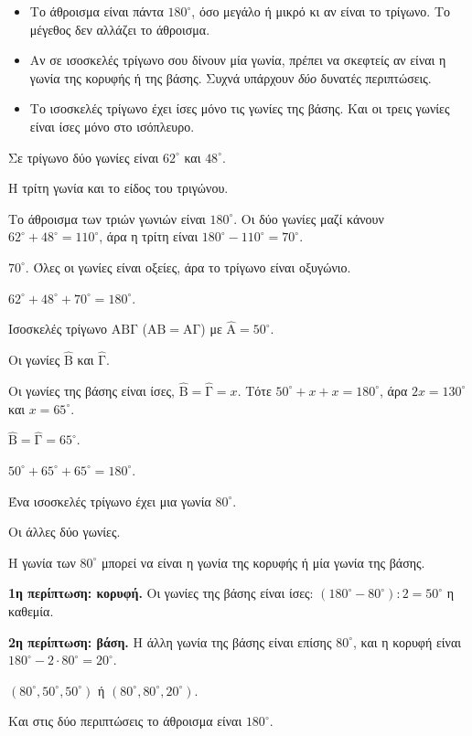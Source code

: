 \begin{prosoxi}
\begin{itemize}[leftmargin=1.2em,itemsep=0.3ex,topsep=2pt]
\item Το άθροισμα είναι πάντα $180^\circ$, όσο μεγάλο ή μικρό κι αν είναι το τρίγωνο. Το μέγεθος δεν αλλάζει το άθροισμα.
\item Αν σε ισοσκελές τρίγωνο σου δίνουν μία γωνία, πρέπει να σκεφτείς αν είναι η γωνία της κορυφής ή της βάσης. Συχνά υπάρχουν \emph{δύο} δυνατές περιπτώσεις.
\item Το ισοσκελές τρίγωνο έχει ίσες μόνο τις γωνίες της βάσης. Και οι τρεις γωνίες είναι ίσες μόνο στο ισόπλευρο.
\end{itemize}
\end{prosoxi}


\tixero Σε τρίγωνο δύο γωνίες είναι $62^\circ$ και $48^\circ$.\par
\tithelo Η τρίτη γωνία και το είδος του τριγώνου.\par
\possindeo Το άθροισμα των τριών γωνιών είναι $180^\circ$. Οι δύο γωνίες μαζί κάνουν $62^\circ+48^\circ=110^\circ$, άρα η τρίτη είναι $180^\circ-110^\circ=70^\circ$.\par
\apantisi $70^\circ$. Όλες οι γωνίες είναι οξείες, άρα το τρίγωνο είναι οξυγώνιο.\par
\elegxos $62^\circ+48^\circ+70^\circ=180^\circ$.

\tixero Ισοσκελές τρίγωνο $\mathrm{ΑΒΓ}$ ($\mathrm{ΑΒ}=\mathrm{ΑΓ}$) με $\hat{\mathrm{Α}}=50^\circ$.\par
\tithelo Οι γωνίες $\hat{\mathrm{Β}}$ και $\hat{\mathrm{Γ}}$.\par
\possindeo Οι γωνίες της βάσης είναι ίσες, $\hat{\mathrm{Β}}=\hat{\mathrm{Γ}}=x$. Τότε $50^\circ+x+x=180^\circ$, άρα $2x=130^\circ$ και $x=65^\circ$.\par
\apantisi $\hat{\mathrm{Β}}=\hat{\mathrm{Γ}}=65^\circ$.\par
\elegxos $50^\circ+65^\circ+65^\circ=180^\circ$.

\tixero Ένα ισοσκελές τρίγωνο έχει μια γωνία $80^\circ$.\par
\tithelo Οι άλλες δύο γωνίες.\par
\possindeo Η γωνία των $80^\circ$ μπορεί να είναι η γωνία της κορυφής ή μία γωνία της βάσης.\par
\textbf{1η περίπτωση: κορυφή.} Οι γωνίες της βάσης είναι ίσες: $(180^\circ-80^\circ):2=50^\circ$ η καθεμία.\par
\textbf{2η περίπτωση: βάση.} Η άλλη γωνία της βάσης είναι επίσης $80^\circ$, και η κορυφή είναι $180^\circ-2\cdot80^\circ=20^\circ$.\par
\apantisi $(80^\circ,50^\circ,50^\circ)$ ή $(80^\circ,80^\circ,20^\circ)$.\par
\elegxos Και στις δύο περιπτώσεις το άθροισμα είναι $180^\circ$.

